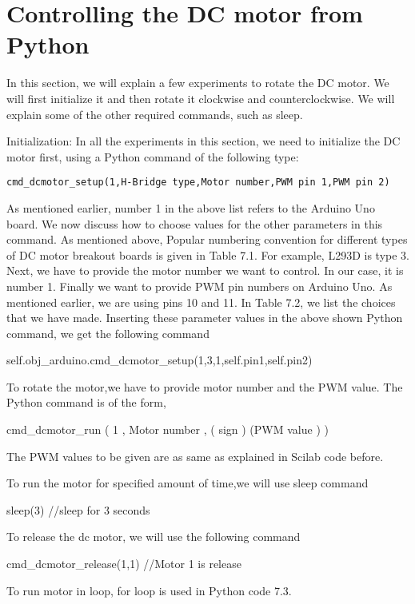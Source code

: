 \section{Controlling the DC motor from Python}

In this section, we will explain a few experiments to rotate the DC motor. We will
first initialize it and then rotate it clockwise and counterclockwise. We will explain
some of the other required commands, such as sleep.

Initialization:
In all the experiments in this section, we need to initialize the DC motor first, using
a Python command of the following type:
\begin{lstlisting}[style=nonumbers]
  cmd_dcmotor_setup(1,H-Bridge type,Motor number,PWM pin 1,PWM pin 2)
\end{lstlisting}

As mentioned earlier, number 1 in the above list refers to the Arduino Uno board.
We now discuss how to choose values for the other parameters in this command. As
mentioned above, Popular numbering convention for different types of DC motor breakout
boards is given in Table 7.1. For example, L293D is type 3. Next, we have to provide
the motor number we want to control. In our case, it is number 1. Finally we want
to provide PWM pin numbers on Arduino Uno. As mentioned earlier, we are using
pins 10 and 11. In Table 7.2, we list the choices that we have made. Inserting these
parameter values in the above shown Python command, we get the following command

self.obj\_arduino.cmd\_dcmotor\_setup(1,3,1,self.pin1,self.pin2)

To rotate the motor,we have to provide motor number
and the PWM value. The Python command is of the form,

cmd\_dcmotor\_run ( 1 , Motor number , ( sign ) (PWM value ) )

The PWM values to be given are as same as explained in Scilab code before.

To run the motor for specified amount of time,we will use sleep command

sleep(3) //sleep for 3 seconds

To release the dc motor, we will use the following command

cmd\_dcmotor\_release(1,1) //Motor 1 is release

To run motor in loop, for loop is used in Python code 7.3.





